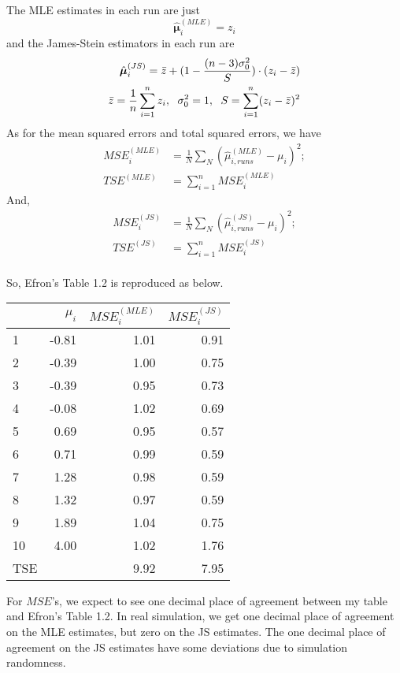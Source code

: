 \documentclass{article}\usepackage{graphicx, color}
\begin{document}
The MLE estimates in each run are just
\begin{displaymath}
\hat{\bm{\mu}}^{(MLE)}_i = z_i
\end{displaymath}
and the James-Stein estimators in each run are
\begin{displaymath}
\begin{split}
\hat{\bm{\mu}}^{(JS)}_i = \bar{z} + (1-\frac{(n-3)\sigma_0^2}{S})\cdot (z_i - \bar{z}) \\
\bar{z} = \frac{1}{n} \sum_{i=1}^n z_i, \hspace{6 pt}
\sigma_0^2 = 1, \hspace{6 pt}
S = \sum_{i=1}^n (z_i - \bar{z})^2
\end{split}
\end{displaymath}
As for the mean squared errors and total squared errors, we have
\begin{displaymath}
\begin{split}
MSE_i^{(MLE)} &= \frac{1}{N} \sum_N (\hat{\mu}_{i,runs}^{(MLE)} - \mu_i)^2; \\
TSE^{(MLE)} &= \sum_{i=1}^n MSE_i^{(MLE)}
\end{split}
\end{displaymath}
And,
\begin{displaymath}
\begin{split}
MSE_i^{(JS)} &= \frac{1}{N} \sum_N (\hat{\mu}_{i,runs}^{(JS)} - \mu_i)^2; \\
TSE^{(JS)} &= \sum_{i=1}^n MSE_i^{(JS)}\\
\end{split}
\end{displaymath}




So, Efron's Table 1.2 is reproduced as below.
\begin{center}
\begin{tabular}{lrrr} \hline
  & $\mu_i$ & $MSE_i^{(MLE)}$ & $MSE_i^{(JS)}$  \\ \hline
1 & -0.81 & 1.01 & 0.91 \\
2 & -0.39 & 1.00 & 0.75 \\
3 & -0.39 & 0.95 & 0.73 \\
4 & -0.08 & 1.02 & 0.69 \\
5 & 0.69 & 0.95 & 0.57 \\
6 & 0.71 & 0.99 & 0.59 \\
7 & 1.28 & 0.98 & 0.59 \\
8 & 1.32 & 0.97 & 0.59 \\
9 & 1.89 & 1.04 & 0.75 \\
10 & 4.00 & 1.02 & 1.76 \\ \hline
TSE &  & 9.92 & 7.95
\end{tabular}
\end{center}
For $MSE$'s, we expect to see one decimal place of agreement 
between my table and Efron's Table 1.2. In real simulation, we
get one decimal place of agreement on the MLE estimates, but zero
on the JS estimates. The one decimal place of agreement on the JS
estimates have some deviations due to simulation randomness.
\end{document}
